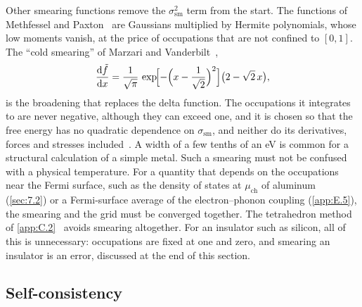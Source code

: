 Other smearing functions remove the $\sigma_{\mathrm{sm}}^2$ term from the start. The functions of Methfessel and Paxton~\cite{methfessel1989high} are Gaussians multiplied by Hermite polynomials, whose low moments vanish, at the price of occupations that are not confined to $[0, 1]$. The ``cold smearing'' of Marzari and Vanderbilt~\cite[Eq.~(1)]{marzari1999thermal},
\begin{equation}
  \frac{\mathrm{d}\tilde f}{\mathrm{d} x} = \frac{1}{\sqrt{\pi}}\,\exp\!\Bigl[-\Bigl(x - \frac{1}{\sqrt{2}}\Bigr)^2\Bigr]\bigl(2 - \sqrt{2}\,x\bigr),
  \label{eq:E.1-cold}
\end{equation}
is the broadening that replaces the delta function. The occupations it integrates to are never negative, although they can exceed one, and it is chosen so that the free energy has no quadratic dependence on $\sigma_{\mathrm{sm}}$, and neither do its derivatives, forces and stresses included~\cite{marzari1999thermal}. A width of a few tenths of an eV is common for a structural calculation of a simple metal. Such a smearing must not be confused with a physical temperature. For a quantity that depends on the occupations near the Fermi surface, such as the density of states at $\mu_{\mathrm{ch}}$ of aluminum (\cref{sec:7.2}) or a Fermi-surface average of the electron--phonon coupling (\cref{app:E.5}), the smearing and the grid must be converged together. The tetrahedron method of \cref{app:C.2}~\cite{blochl1994improved} avoids smearing altogether. For an insulator such as silicon, all of this is unnecessary: occupations are fixed at one and zero, and smearing an insulator is an error, discussed at the end of this section.

\subsection{Self-consistency}

